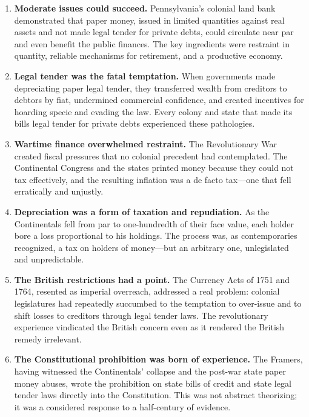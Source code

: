 \documentclass[12pt]{article}
\begin{document}
\begin{enumerate}
    \item \textbf{Moderate issues could succeed.} Pennsylvania's colonial land
    bank demonstrated that paper money, issued in limited quantities against
    real assets and not made legal tender for private debts, could circulate
    near par and even benefit the public finances.  The key ingredients were
    restraint in quantity, reliable mechanisms for retirement, and a productive
    economy.

    \item \textbf{Legal tender was the fatal temptation.} When governments
    made depreciating paper legal tender, they transferred wealth from
    creditors to debtors by fiat, undermined commercial confidence, and
    created incentives for hoarding specie and evading the law.  Every colony
    and state that made its bills legal tender for private debts experienced
    these pathologies.

    \item \textbf{Wartime finance overwhelmed restraint.}  The Revolutionary
    War created fiscal pressures that no colonial precedent had contemplated.
    The Continental Congress and the states printed money because they could
    not tax effectively, and the resulting inflation was a de facto tax---one
    that fell erratically and unjustly.

    \item \textbf{Depreciation was a form of taxation and repudiation.}
    As the Continentals fell from par to one-hundredth of their face value,
    each holder bore a loss proportional to his holdings.  The process was,
    as contemporaries recognized, a tax on holders of money---but an
    arbitrary one, unlegislated and unpredictable.

    \item \textbf{The British restrictions had a point.}  The Currency Acts of
    1751 and 1764, resented as imperial overreach, addressed a real problem:
    colonial legislatures had repeatedly succumbed to the temptation to
    over-issue and to shift losses to creditors through legal tender laws.
    The revolutionary experience vindicated the British concern even as it
    rendered the British remedy irrelevant.

    \item \textbf{The Constitutional prohibition was born of experience.}
    The Framers, having witnessed the Continentals' collapse and the post-war
    state paper money abuses, wrote the prohibition on state bills of credit
    and state legal tender laws directly into the Constitution.  This was not
    abstract theorizing; it was a considered response to a half-century of
    evidence.
\end{enumerate}
\end{document}
